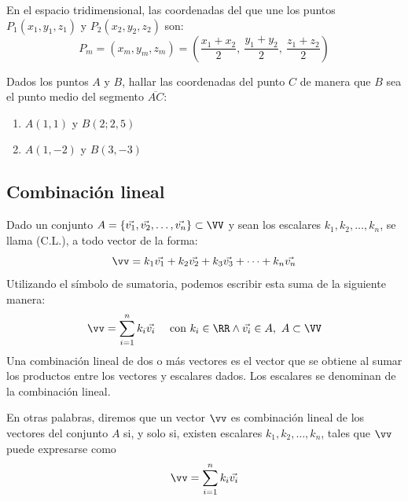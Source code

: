 En el espacio tridimensional, las coordenadas del  que une los puntos $P_1(x_1, y_1, z_1)$ y $P_2(x_2, y_2, z_2)$ son:
    \begin{equation*}
        P_m = (x_m, y_m, z_m) = \left(\frac{x_1 + x_2}{2},\ \frac{y_1 + y_2}{2},\ \frac{z_1 + z_2}{2}\right)
    \end{equation*}

\begin{preguntabox}[Resolver:]
    Dados los puntos $A$ y $B$, hallar las coordenadas del punto $C$ de manera que $B$ sea el punto medio del segmento $\overline{AC}$:
    \begin{enumerate}
        \item $A(1,1)$ y $B(2; 2,5)$
        \item $A(1, -2)$ y $B(3, -3)$
    \end{enumerate}
\end{preguntabox}




\subsection{Combinación lineal}

Dado un conjunto $A = \{\vec{v_1}, \vec{v_2}, \dots, \vec{v_n}\} \subset \VV$ y sean los escalares $k_1, k_2, \dots, k_n$, se llama  (C.L.), a todo vector de la forma:
    \begin{equation*}
        \vv = k_1 \vec{v_1} + k_2 \vec{v_2} + k_3 \vec{v_3} + \dots + k_n \vec{v_n}
    \end{equation*}
Utilizando el símbolo de sumatoria, podemos escribir esta suma de la siguiente manera:
\begin{equation*}
    \vv = \sum_{i=1}^{n} k_i \vec{v_i} \quad\text{ con } k_i \in \RR \land \vec{v_i} \in A,\ A \subset \VV
\end{equation*}
Una combinación lineal de dos o más vectores es el vector que se obtiene al sumar los productos entre los vectores y escalares dados. Los escalares se denominan  de la combinación lineal.

\begin{tcolorbox}[colframe= black, boxrule=0.8pt, sharp corners]
    En otras palabras, diremos que un vector $\vv$ es combinación lineal de los vectores del conjunto $A$ si, y solo si, existen escalares $k_1, k_2, \dots, k_n$, tales que $\vv$ puede expresarse como
        \begin{equation*}
            \vv = \sum_{i=1}^{n} k_i \vec{v_i}
        \end{equation*}
\end{tcolorbox}

